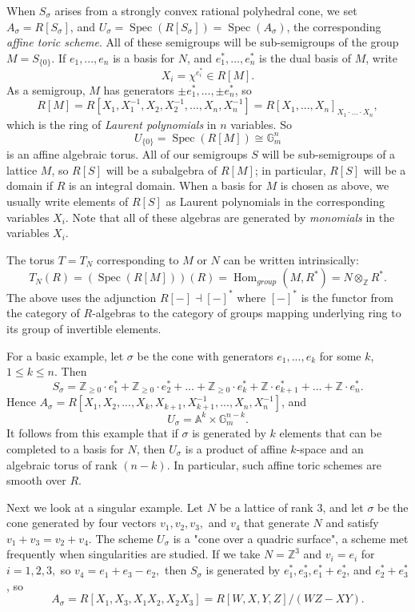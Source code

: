\documentclass[10pt,a4paper]{book}
\newcommand{\on}{\operatorname}
\DeclareMathOperator{\Spec}{Spec}
\begin{document}
When $S_\sigma$ arises from a strongly convex rational polyhedral cone, we set $A_\sigma = R[S_\sigma]$, and $U_\sigma = \Spec(R[S_\sigma]) = \Spec(A_\sigma)$, the corresponding \textit{affine toric scheme}. All of these semigroups will be sub-semigroups of the group $M = S_{\{0\}}$. If $e_1,..., e_n$ is a basis for $N$, and $e_1^*,..., e_n^*$ is the dual basis of $M$, write 
\[
X_i = \chi^{e_i^*} \in R[M].
\]
As a semigroup, $M$ has generators $\pm e_1^*, ..., \pm e_n^*$, so
\[
R[M] = R[X_1,X_1^{-1},X_2,X_2^{-1},... ,X_n, X_n^{-1}] = R[X_1,...,X_n]_{X_1\cdot... \cdot X_n},
\]
which is the ring of \textit{Laurent polynomials} in $n$ variables. So
\[
U_{\{0\}} = \Spec(R[M])\cong \mathbb{G}_m^n
\]
is an affine algebraic torus. All of our semigroups $S$ will be sub-semigroups of a lattice $M$, so $R[S]$ will be a subalgebra of $R[M]$; in particular, $R[S]$ will be a domain if $R$ is an integral domain. When a basis for $M$ is chosen as above, we usually write elements of $R[S]$ as Laurent polynomials in the corresponding variables $X_i$. Note that all of these algebras are generated by \textit{monomials} in the variables $X_i$.

The torus $T = T_N$ corresponding to $M$ or $N$ can be written intrinsically:
\[
T_N(R) = (\Spec(R[M]))(R) = \on{Hom}_{group}(M,R^*) = N\otimes_\mathbb{Z}R^*.
\]
The above uses the adjunction $R[-]\dashv [-]^*$ where $[-]^*$ is the functor from the category of $R$-algebras to the category of groups mapping underlying ring to its group of invertible elements.

For a basic example, let $\sigma$ be the cone with generators $e_1,..., e_k$ for some $k$, $1 \leq k \leq n$. Then
\[
S_\sigma = \mathbb{Z}_{\geq 0}\cdot e_1^* + \mathbb{Z}_{\geq 0}\cdot e_2^* + ... + \mathbb{Z}_{\geq 0}\cdot e_k^* + \mathbb{Z}\cdot e_{k+1}^* + ... + \mathbb{Z}\cdot e_n^*.
\]
Hence $A_\sigma = R[X_1, X_2, ..., X_k, X_{k+1}, X_{k+1}^{-1}, ..., X_n, X_n^{-1}]$, and
\[
U_\sigma = \mathbb{A}^k \times \mathbb{G}_m^{n-k}.
\]
It follows from this example that if $\sigma$ is generated by $k$ elements that can be completed to a basis for $N$, then $U_\sigma$ is a product of affine $k$-space and an algebraic torus of rank $(n-k)$. In particular, such affine toric schemes are smooth over $R$.

Next we look at a singular example. Let $N$ be a lattice of rank $3$, and let $\sigma$ be the cone generated by four vectors $v_1, v_2, v_3,$ and $v_4$ that generate $N$ and satisfy $v_1 + v_3 = v_2 + v_4$. The scheme $U_\sigma$ is a "cone over a quadric surface", a scheme met frequently when
singularities are studied. If we take $N = \mathbb{Z}^3$ and $v_i = e_i$ for $i = 1, 2, 3,$ so $v_4 = e_1 + e_3 - e_2,$ then $S_\sigma$ is generated by $e_1^*, e_3^*, e_1^*+e_2^*$, and $e_2^*+e_3^*$, so
\[
A_\sigma = R[X_1,X_3, X_1X_2, X_2X_3] = R[W,X,Y,Z]/(WZ-XY).
\]
\end{document}
